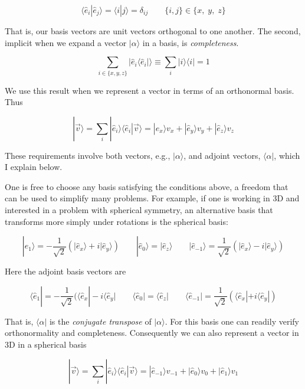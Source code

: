 \[
  \langle \hat{e}_i  | \hat{e}_j \rangle = \langle i | j \rangle = \delta_{ij}
  \qquad \{i , j\} \in \{x, \; y, \; z\}
\] \vspace{3px}

That is, our basis vectors are unit vectors orthogonal to one another. The
second, implicit when we expand a vector $| \alpha \rangle$ in a basis, is
\textit{completeness}. 

\[
  \sum_{i\in\{x, y, z\}} | \hat{e}_i \langle \hat{e}_i | \rangle \equiv \sum_i
  | i \rangle\langle i | = 1
\] \vspace{3px}

We use this result when we represent a vector in terms of an orthonormal basis.
Thus

\[
|\vec{v} \rangle = \sum_i | \hat{e}_i \rangle \langle \hat{e}_i  | \vec{v}
\rangle = | \hat{e}_x \rangle v_x + | \hat{e}_y \rangle v_y + | \hat{e}_z
\rangle v_z
\] \vspace{3px}

These requirements involve both vectors, e.g., $|\alpha\rangle$, and adjoint
vectors, $\langle \alpha |$, which I explain below. 

One is free to choose any basis satisfying the conditions above, a freedom that
can be used to simplify many problems. For example, if one is working in 3D and
interested in a problem with spherical symmetry, an alternative basis that
transforms more simply under rotations is the spherical basis: 

\[
|\hat{e}_1\rangle = -\frac{1}{\sqrt{2}}(|\hat{e}_x\rangle + i|\hat{e}_y\rangle)
\qquad |\hat{e}_0\rangle = |\hat{e}_z \rangle \qquad |\hat{e}_{-1}\rangle
= \frac{1}{\sqrt{2}}(|\hat{e}_x\rangle - i|\hat{e}_y\rangle )
\] \vspace{3px}

Here the adjoint basis vectors are 

\[
\langle \hat{e}_1| = -\frac{1}{\sqrt{2}}(\langle \hat{e}_x| - i\langle \hat{e}_y|
\qquad \langle \hat{e}_0| = \langle \hat{e}_z | \qquad \langle \hat{e}_{-1} |
= \frac{1}{\sqrt{2}}(\langle \hat{e}_x| + i\langle \hat{e}_y| )
\] \vspace{3px}

That is, $\langle \alpha |$ is the \textit{conjugate transpose}  of $| \alpha
\rangle$. For this basis one can readily verify orthonormality and
completeness. Consequently we can also represent a vector in 3D in a spherical
basis 

\[
| \vec{v} \rangle = \sum_i |\hat{e}_i\rangle \langle \hat{e}_i  | \vec{v}
\rangle = | \hat{e}_{-1} \rangle v_{-1} + | \hat{e}_0 \rangle v_0 + | \hat{e}_1
\rangle v_1
\] \vspace{3px}

